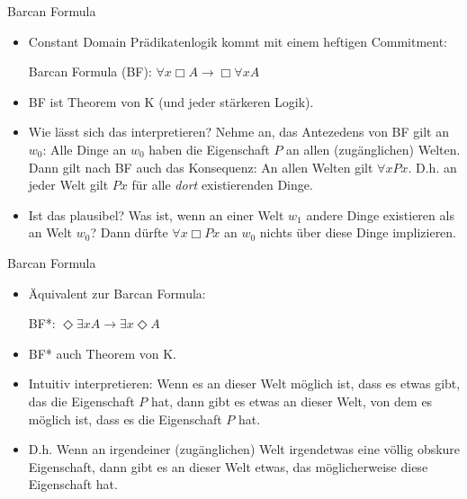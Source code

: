 \documentclass[12pt]{beamer}
\begin{document}
\begin{frame}{Barcan Formula}

  \begin{itemize}[<+->]
  \item Constant Domain Prädikatenlogik kommt mit einem heftigen
    Commitment:
    \begin{center}
      Barcan Formula (BF): $\forall x \Box A \to \Box \forall x A$
    \end{center}
  \item BF ist Theorem von K (und jeder stärkeren Logik).
  \item Wie lässt sich das interpretieren? Nehme an, das Antezedens
    von BF gilt an $w_0$: Alle Dinge an $w_0$ haben die Eigenschaft
    $P$ an allen (zugänglichen) Welten. Dann gilt nach BF auch das
    Konsequenz: An allen Welten gilt $\forall x Px$. D.h. an jeder
    Welt gilt $Px$ für alle \emph{dort} existierenden Dinge.
  \item Ist das plausibel? Was ist, wenn an einer Welt $w_1$ andere
    Dinge existieren als an Welt $w_0$? Dann dürfte
    $\forall x \Box Px$ an $w_0$ nichts über diese Dinge
    implizieren. \end{itemize}
  
\end{frame}

\begin{frame}{Barcan Formula}

  \begin{itemize}
  \item Äquivalent zur Barcan Formula:
    \begin{center}
      BF*: $\Diamond \exists x A \to \exists x \Diamond A$
    \end{center}
  \item BF* auch Theorem von K.
  \item Intuitiv interpretieren: Wenn es an dieser Welt möglich ist,
    dass es etwas gibt, das die Eigenschaft $P$ hat, dann gibt es
    etwas an dieser Welt, von dem es möglich ist, dass es die
    Eigenschaft $P$ hat.
  \item D.h. Wenn an irgendeiner (zugänglichen) Welt irgendetwas eine
    völlig obskure Eigenschaft, dann gibt es an dieser Welt etwas, das
    möglicherweise diese Eigenschaft hat.
  
  \end{itemize}
\end{frame}
\end{document}
